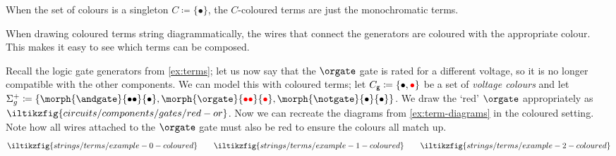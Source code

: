 \begin{remark}
    When the set of colours is a singleton \(C \coloneqq \{\bullet\}\), the
    \(C\)-coloured terms are just the monochromatic terms.
\end{remark}

When drawing coloured terms string diagrammatically, the wires that connect the
generators are coloured with the appropriate colour.
This makes it easy to see which terms can be composed.

\begin{example}
    Recall the logic gate generators from \cref{ex:terms}; let us now say that
    the \(\orgate\) gate is rated for a different voltage, so it is no longer
    compatible with the other components.
    We can model this with coloured terms; let
    \(C_\mathsf{g} \coloneqq \{\bullet,\textcolor{red}{\bullet}\}\) be a set of
    \emph{voltage colours} and let \(
    \Sigma_g^+
    \coloneqq
    \{\morph{\andgate}{\bullet\bullet}{\bullet}, \morph{\orgate}{\redbullet\redbullet}{\redbullet}, \morph{\notgate}{\bullet}{\bullet}\}
    \).
    We draw the `red' \(\orgate\) appropriately as \(
    \iltikzfig{circuits/components/gates/red-or}
    \).
    Now we can recreate the diagrams from \cref{ex:term-diagrams} in the
    coloured setting.
    Note how all wires attached to the \(\orgate\) gate must also be red
    to ensure the colours all match up.
    \begin{gather*}
        \iltikzfig{strings/terms/example-0-coloured}
        \qquad
        \iltikzfig{strings/terms/example-1-coloured}
        \qquad
        \iltikzfig{strings/terms/example-2-coloured}
    \end{gather*}
\end{example}
